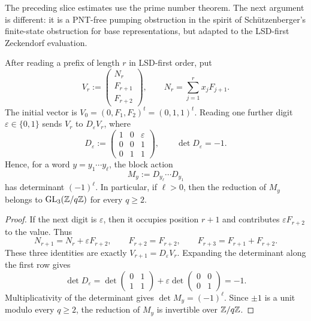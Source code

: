 The preceding slice estimates use the prime number theorem. The next
argument is different: it is a PNT-free pumping obstruction in the
spirit of Sch\"utzenberger's finite-state obstruction for base
representations, but adapted to the LSD-first Zeckendorf evaluation.

\begin{lemma}
  \label{lem:zeckendorf-unimodular-block-action}
  After reading a prefix of length \(r\) in LSD-first order, put
  \[
    V_r:=
    \begin{pmatrix}
      N_r\\ F_{r+1}\\ F_{r+2}
    \end{pmatrix},
    \qquad
    N_r=\sum_{j=1}^r x_jF_{j+1}.
  \]
  The initial vector is \(V_0=(0,F_1,F_2)^t=(0,1,1)^t\). Reading one
  further digit \(\varepsilon\in\{0,1\}\) sends \(V_r\) to
  \(D_\varepsilon V_r\), where
  \[
    D_\varepsilon:=
    \begin{pmatrix}
      1&0&\varepsilon\\
      0&0&1\\
      0&1&1
    \end{pmatrix},
    \qquad
    \det D_\varepsilon=-1.
  \]
  Hence, for a word \(y=y_1\cdots y_\ell\), the block action
  \[
    M_y:=D_{y_\ell}\cdots D_{y_1}
  \]
  has determinant \((-1)^\ell\). In particular, if \(\ell>0\), then
  the reduction of \(M_y\) belongs to
  \(\operatorname{GL}_3(\mathbb{Z}/q\mathbb{Z})\) for every \(q\ge2\).
\end{lemma}

\begin{proof}
  If the next digit is \(\varepsilon\), then it occupies position
  \(r+1\) and contributes \(\varepsilon F_{r+2}\) to the value. Thus
  \[
    N_{r+1}=N_r+\varepsilon F_{r+2},\qquad
    F_{r+2}=F_{r+2},\qquad
    F_{r+3}=F_{r+1}+F_{r+2}.
  \]
  These three identities are exactly
  \(V_{r+1}=D_\varepsilon V_r\). Expanding the determinant along the
  first row gives
  \[
    \det D_\varepsilon
    =\det\begin{pmatrix}0&1\\1&1\end{pmatrix}
     +\varepsilon\det\begin{pmatrix}0&0\\0&1\end{pmatrix}
    =-1.
  \]
  Multiplicativity of the determinant gives
  \(\det M_y=(-1)^\ell\). Since \(\pm1\) is a unit modulo every
  \(q\ge2\), the reduction of \(M_y\) is invertible over
  \(\mathbb{Z}/q\mathbb{Z}\).
\end{proof}


